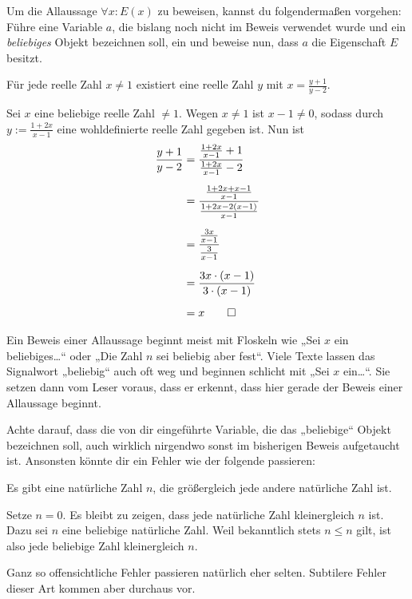  
 

\begin{axi}\label{allbeweis}
Um die Allaussage $\forall x: E(x)$ zu beweisen, kannst du folgendermaßen vorgehen: \\
 Führe eine Variable $a$, die bislang noch nicht im Beweis verwendet wurde und ein \emph{beliebiges} Objekt bezeichnen soll, ein und beweise nun, dass $a$ die Eigenschaft $E$ besitzt.
\end{axi}




\begin{bsp}
 Für jede reelle Zahl $x\neq 1$ existiert eine reelle Zahl $y$ mit $x=\frac{y+1}{y-2}$.
\end{bsp}
\begin{bew}
Sei $x$ eine beliebige reelle Zahl $\neq 1$. Wegen $x\neq 1$ ist $x-1\neq 0$, sodass durch $y:= \frac{1+2x}{x-1}$ eine wohldefinierte reelle Zahl gegeben ist. Nun ist
\begingroup
\allowdisplaybreaks
\begin{align*}
 \frac{y+1}{y-2} & = \frac{\frac{1+2x}{x-1}+1}{ \frac{1+2x}{x-1}-2} \\[0.5em]
 & = \frac{\frac{1+2x+x-1}{x-1}}{\frac{1+2x - 2(x-1)}{x-1}} \\[0.5em]
 & =\frac{\frac{3x}{x-1}}{\frac{3}{x-1}} \\[0.5em]
 & = \frac{3x \cdot (x-1)}{3\cdot (x-1)} \\[0.5em]
 & = x \qed
\end{align*}
\endgroup
\end{bew}


  
  

  
    \begin{bem}[Signalwörter]
   Ein Beweis einer Allaussage beginnt meist mit Floskeln wie „Sei $x$ ein beliebiges\dots“ oder „Die Zahl $n$ sei beliebig aber fest“. Viele Texte lassen das Signalwort „beliebig“ auch oft weg und beginnen schlicht mit „Sei $x$ ein\dots“. Sie setzen dann vom Leser voraus, dass er erkennt, dass hier gerade der Beweis einer Allaussage beginnt.
  \end{bem}
  
  

 
 
 \begin{bem}[*]
  Achte darauf, dass die von dir eingeführte Variable, die das „beliebige“ Objekt bezeichnen soll, auch wirklich nirgendwo sonst im bisherigen Beweis aufgetaucht ist. Ansonsten könnte dir ein Fehler wie der folgende passieren:
  \begin{bsp}[*]
     Es gibt eine natürliche Zahl $n$, die größergleich jede andere natürliche Zahl ist.
   \end{bsp}
   \begin{bew}
Setze $n=0$. Es bleibt zu zeigen, dass jede natürliche Zahl kleinergleich $n$ ist. Dazu sei $n$ eine beliebige natürliche Zahl. Weil bekanntlich stets $n\le n$ gilt, ist also jede beliebige Zahl kleinergleich $n$.
   \end{bew}
Ganz so offensichtliche Fehler passieren natürlich eher selten. Subtilere Fehler dieser Art kommen aber durchaus vor.
 \end{bem}

